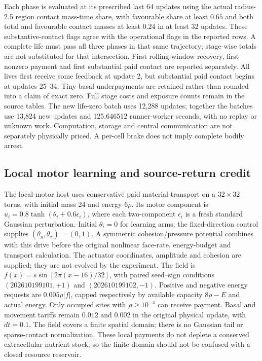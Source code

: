 Each phase is evaluated at its prescribed last 64 updates using the actual radius-2.5 region contact mass-time share, with favourable share at least $0.65$ and both total and favourable contact masses at least $0.24$ in at least 32 updates. These substantive-contact flags agree with the operational flags in the reported rows. A complete life must pass all three phases in that same trajectory; stage-wise totals are not substituted for that intersection. First rolling-window recovery, first nonzero payment and first substantial paid contact are reported separately. All lives first receive some feedback at update 2, but substantial paid contact begins at updates 25--34. Tiny basal underpayments are retained rather than rounded into a claim of exact zero. Full stage costs and exposure counts remain in the source tables. The new life-zero batch uses 12,288 updates; together the batches use 13,824 new updates and 125.646512 runner-worker seconds, with no replay or unknown work. Computation, storage and central communication are not separately physically priced. A per-cell brake does not imply complete bodily arrest.


\subsection*{Local motor learning and source-return credit}

The local-motor host uses conservative paid material transport on a $32\times32$ torus, with initial mass 24 and energy $6\rho$. Its motor component is $u_i=0.8\tanh(\theta_i+0.6\epsilon_i)$, where each two-component $\epsilon_i$ is a fresh standard Gaussian perturbation. Initial $\theta_i=0$ for learning arms; the fixed-direction control supplies $(\theta_y,\theta_x)=(0,1)$. A symmetric cohesion/pressure potential combines with this drive before the original nonlinear face-rate, energy-budget and transport calculation. The actuator coordinates, amplitude and cohesion are supplied; they are not evolved by the experiment. The field is $f(x)=s\sin[2\pi(x-16)/32]$, with paired seed--sign conditions $(202610199101,+1)$ and $(202610199102,-1)$. Positive and negative energy requests are $0.005\rho|f|$, capped respectively by available capacity $8\rho-E$ and actual energy. Only occupied sites with $\rho\ge10^{-4}$ can receive payment. Basal and movement tariffs remain $0.012$ and $0.002$ in the original physical update, with $dt=0.1$. The field covers a finite spatial domain; there is no Gaussian tail or sparse-contact normalization. These local payments do not deplete a conserved extracellular nutrient stock, so the finite domain should not be confused with a closed resource reservoir.

